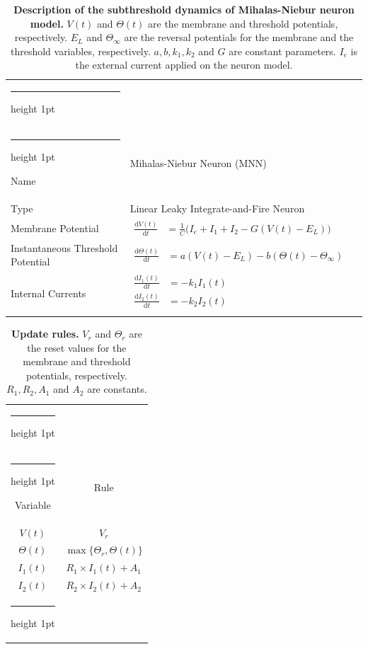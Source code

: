 \documentclass[10pt,a4paper,onecolumn]{article}
\makeatletter
\newcommand{\Rm}[1]{\mathrm{#1}}
\newcommand{\thickhline}{%
    \noalign {\ifnum 0=`}\fi \hrule height 1pt
    \futurelet \reserved@a \@xhline
}
\makeatother
\begin{document}
\begin{table}[!htbp]
    \centering
    \begin{tabular}{p{3.5cm}ll}
        \thickhline
        \multicolumn{2}{c}{Neuron Model} \\\thickhline
        \rowcolor{Gray}
        Name  &  Mihalas-Niebur Neuron (MNN) \\ \rowcolor{LightGray}
        Type  &  Linear Leaky Integrate-and-Fire Neuron  \\ \rowcolor{Gray}
        Membrane Potential & $
            \begin{aligned}
                \frac{\Rm{d}V(t)}{\Rm{d}t} &= \frac{1}{C} \Big(I_e + I_1 + I_2 - G(V(t) -
                E_L)  \Big)
            \end{aligned}$ \\ \rowcolor{LightGray}
        Instantaneous Threshold Potential  & $
            \begin{aligned}
                \frac{\Rm{d}\Theta(t)}{\Rm{d}t} &= a(V(t) - E_L) - b(\Theta(t) -
                \Theta_{\infty}) 
            \end{aligned} $
            \\ \rowcolor{Gray}
        Internal Currents & $
            \begin{aligned}
                \frac{\Rm{d}I_{1}(t)}{\Rm{d}t} &= -k_1I_1(t)\\
                \frac{\Rm{d}I_{2}(t)}{\Rm{d}t} &= -k_2I_2(t) \\
            \end{aligned} $
    \end{tabular}
    \caption{{\bfseries \sffamily Description of the subthreshold dynamics of
    Mihalas-Niebur neuron model.} $V(t)$ and $\Theta(t)$ are the membrane and 
    threshold potentials, respectively. $E_L$ and $\Theta_{\infty}$ are the
    reversal potentials for the membrane and the threshold variables,
    respectively. $a, b, k_1, k_2$ and $G$ are constant parameters. $I_e$ is
    the external current applied on the neuron model.} 
    \label{table:2}
\end{table}

\begin{table}[!htbp]
    \centering
    \begin{tabular}{cc}
        \thickhline
        \multicolumn{2}{c}{Update rules} \\ \thickhline
        Variable & Rule  \\ \rowcolor{Gray}
        $V(t)$ & $V_r$  \\ \rowcolor{LightGray}
        $\Theta(t)$ & $\max\{\Theta_r, \Theta(t) \}$ \\ \rowcolor{Gray}
        $I_1(t)$ & $R_1 \times I_1(t) + A_1$ \\ \rowcolor{LightGray} 
        $I_2(t) $ & $R_2 \times I_2(t) + A_2$ \\\thickhline
    \end{tabular}
    \caption{{\bfseries \sffamily Update rules.} $V_r$ and $\Theta_r$
    are the reset values for the membrane and threshold potentials,
    respectively. $R_1, R_2, A_1$ and $A_2$ are constants.}
    \label{table:3}
\end{table}
\end{document}
